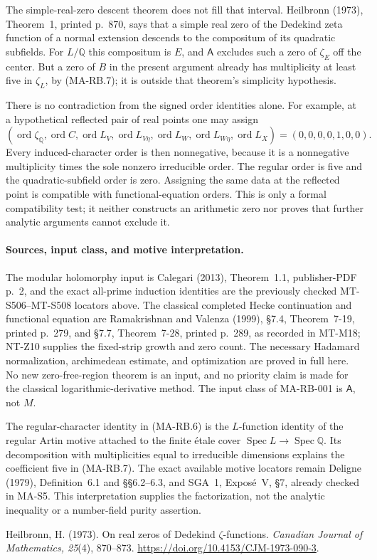 The simple-real-zero descent theorem does not fill that interval.
Heilbronn (1973), Theorem~1, printed p.~870, says that a simple
real zero of the Dedekind zeta function of a normal extension
descends to the compositum of its quadratic subfields.
For $L/\mathbb Q$ this compositum is $E$, and $\mathsf A$
excludes such a zero of $\zeta_E$ off the center.
But a zero of $B$ in the present argument already has
multiplicity at least five in $\zeta_L$, by (MA-RB.7);
it is outside that theorem's simplicity hypothesis.

There is no contradiction from the signed order identities alone.
For example, at a hypothetical reflected pair of real points one
may assign
\[
 (\operatorname{ord}\zeta_{\mathbb Q},
   \operatorname{ord}C,\operatorname{ord}L_V,
   \operatorname{ord}L_{V\eta},\operatorname{ord}L_W,
   \operatorname{ord}L_{W\eta},\operatorname{ord}L_X)
                       =(0,0,0,0,1,0,0).
 \tag{MA-RB.16}
\]
Every induced-character order is then nonnegative, because
it is a nonnegative multiplicity times the sole nonzero
irreducible order.  The regular order is five and the
quadratic-subfield order is zero.  Assigning the same data
at the reflected point is compatible with functional-equation
orders.  This is only a formal compatibility test; it neither
constructs an arithmetic zero nor proves that further analytic
arguments cannot exclude it.

\paragraph{Sources, input class, and motive interpretation.}
The modular holomorphy input is Calegari (2013), Theorem~1.1,
publisher-PDF p.~2, and the exact all-prime induction identities
are the previously checked MT-S506--MT-S508 locators above.
The classical completed Hecke continuation and functional
equation are Ramakrishnan and Valenza (1999), \S7.4,
Theorem~7-19, printed p.~279, and \S7.7, Theorem~7-28,
printed p.~289, as recorded in MT-M18; NT-Z10 supplies the
fixed-strip growth and zero count.  The necessary Hadamard
normalization, archimedean estimate, and optimization are
proved in full here.  No new zero-free-region theorem is an
input, and no priority claim is made for the classical
logarithmic-derivative method.  The input class of MA-RB-001
is $\mathsf A$, not $M$.

The regular-character identity in (MA-RB.6) is the
$L$-function identity of the regular Artin motive attached
to the finite \'etale cover $\operatorname{Spec}L\to
\operatorname{Spec}\mathbb Q$.  Its decomposition with
multiplicities equal to irreducible dimensions explains
the coefficient five in (MA-RB.7).
The exact available motive locators remain Deligne (1979),
Definition~6.1 and \S\S6.2--6.3, and SGA~1,
Expos\'e~V, \S7, already checked in MA-S5.
This interpretation supplies the factorization, not the
analytic inequality or a number-field purity assertion.

Heilbronn, H. (1973). On real zeros of Dedekind $\zeta$-functions.
\emph{Canadian Journal of Mathematics, 25}(4), 870--873.
\url{https://doi.org/10.4153/CJM-1973-090-3}.
